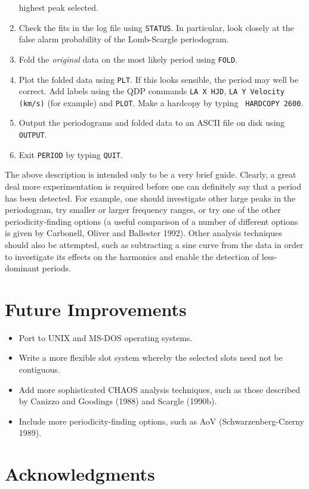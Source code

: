 \begin{enumerate}
highest peak selected.
\item Check the fits in the log file using {\tt STATUS}. In particular, look
closely at the false alarm probability of the Lomb-Scargle periodogram.
\item Fold the {\em original} data on the most likely period using {\tt FOLD}.
\item Plot the folded data using {\tt PLT}. If this looks sensible, the period
may well be correct. Add labels using the QDP commands {\tt LA X HJD}, {\tt LA
Y Velocity (km/s)} (for example) and {\tt PLOT}. Make a hardcopy by typing {\tt
HARDCOPY 2600}. 
\item Output the periodograms and folded data to an ASCII file on disk using
{\tt OUTPUT}. 
\item Exit {\tt PERIOD} by typing {\tt QUIT}. 
\end{enumerate}

The above description
is intended only to be a very brief guide. Clearly, a great deal more
experimentation is required before one can definitely say that a period has
been detected. For example, one should investigate other large peaks in the
periodogram, try smaller or larger frequency ranges, or try one of the other
periodicity-finding options (a useful comparison of a number of different
options is given by Carbonell, Oliver and Ballester 1992). Other analysis
techniques should also be attempted, such as subtracting a sine curve from the
data in order to investigate its effects on the harmonics and enable the
detection of less-dominant periods. 

\section{Future Improvements}

\begin{itemize}
\item Port to UNIX and MS-DOS operating systems.
\item Write a more flexible slot system whereby the selected slots need not
be contiguous.
\item Add more sophisticated CHAOS analysis techniques, such as those described
by Canizzo and Goodings (1988) and Scargle (1990b).
\item Include more periodicity-finding options, such as AoV 
(Schwarzenberg-Czerny 1989).
\end{itemize}

\section{Acknowledgments}

